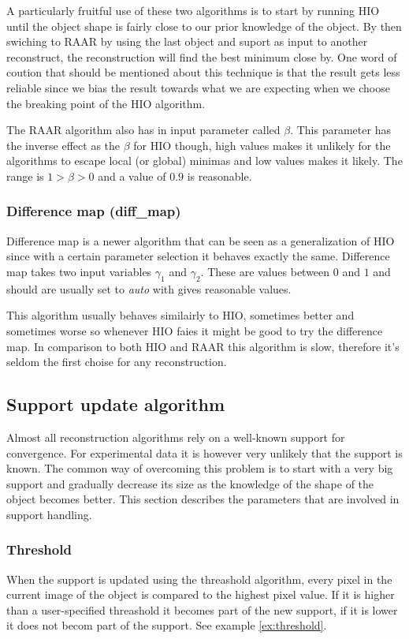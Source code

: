 \documentclass[11pt,a4paper]{article}
\begin{document}
A particularly fruitful use of these two algorithms is to start by running HIO until the object shape is fairly close to our prior knowledge of the object. By then swiching to RAAR by using the last object and suport as input to another reconstruct, the reconstruction will find the best minimum close by. One word of coution that should be mentioned about this technique is that the result gets less reliable since we bias the result towards what we are expecting when we choose the breaking point of the HIO algorithm.

The RAAR algorithm also has in input parameter called $\beta$. This parameter has the inverse effect as the $\beta$ for HIO though, high values makes it unlikely for the algorithms to escape local (or global) minimas and low values makes it likely. The range is $1 > \beta > 0$ and a value of $0.9$ is reasonable.

\subsubsection{Difference map (diff\_map)}
Difference map is a newer algorithm that can be seen as a generalization of HIO since with a certain parameter selection it behaves exactly the same. Difference map takes two input variables $\gamma_1$ and $\gamma_2$. These are values between $0$ and $1$ and should are usually set to \emph{auto} with gives reasonable values.

This algorithm usually behaves similairly to HIO, sometimes better and sometimes worse so whenever HIO faies it might be good to try the difference map. In comparison to both HIO and RAAR this algorithm is slow, therefore it's seldom the first choise for any reconstruction.

\subsection{Support update algorithm}
Almost all reconstruction algorithms rely on a well-known support for convergence. For experimental data it is however very unlikely that the support is known. The common way of overcoming this problem is to start with a very big support and gradually decrease its size as the knowledge of the shape of the object becomes better. This section describes the parameters that are involved in support handling.

\subsubsection{Threshold}
When the support is updated using the threashold algorithm, every pixel in the current image of the object is compared to the highest pixel value. If it is higher than a user-specified threashold it becomes part of the new support, if it is lower it does not becom part of the support. See example \ref{ex:threshold}.
\end{document}
